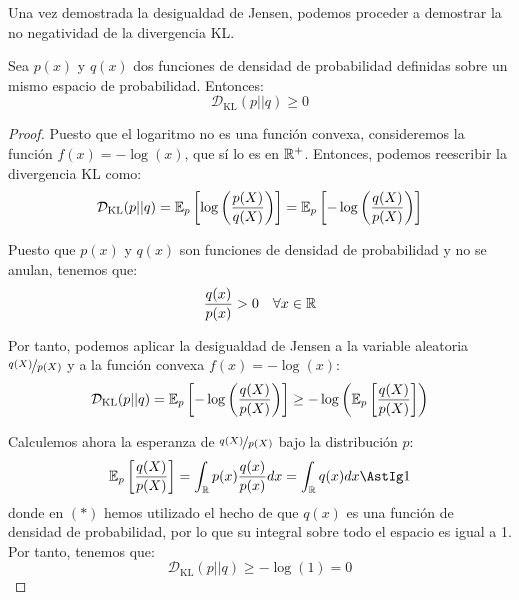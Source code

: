 \documentclass[12pt]{article}
\begin{document}
Una vez demostrada la desigualdad de Jensen, podemos proceder a demostrar la no negatividad de la divergencia KL.
\begin{teo}
Sea $p(x)$ y $q(x)$ dos funciones de densidad de probabilidad definidas sobre un mismo espacio de probabilidad. Entonces:
\begin{equation}
\mathcal{D}_{\text{KL}}(p||q) \geq 0
\end{equation}
\end{teo}
\begin{proof}
Puesto que el logaritmo no es una función convexa, consideremos la función $f(x) = -\log(x)$, que sí lo es en $\mathbb{R}^+$. Entonces, podemos reescribir la divergencia KL como:
\begin{equation*}
\mathcal{D}_{\text{KL}}(p||q) = \mathbb{E}_p\left[\log\left(\frac{p(X)}{q(X)}\right)\right] = \mathbb{E}_p\left[-\log\left(\frac{q(X)}{p(X)}\right)\right]
\end{equation*}

Puesto que $p(x)$ y $q(x)$ son funciones de densidad de probabilidad y no se anulan, tenemos que:
\begin{equation*}
  \dfrac{q(x)}{p(x)} > 0 \quad \forall x\in \mathbb{R}
\end{equation*}

Por tanto, podemos aplicar la desigualdad de Jensen a la variable aleatoria $\nicefrac{q(X)}{p(X)}$ y a la función convexa $f(x) = -\log(x)$:
\begin{equation*}
\mathcal{D}_{\text{KL}}(p||q) = \mathbb{E}_p\left[-\log\left(\frac{q(X)}{p(X)}\right)\right] \geq -\log\left(\mathbb{E}_p\left[\frac{q(X)}{p(X)}\right]\right)
\end{equation*}

Calculemos ahora la esperanza de $\nicefrac{q(X)}{p(X)}$ bajo la distribución $p$:
\begin{equation*}
\bb{E}_p\left[\frac{q(X)}{p(X)}\right] = \int_{\bb{R}} p(x) \frac{q(x)}{p(x)} dx = \int_{\bb{R}} q(x) dx \AstIg 1
\end{equation*}
donde en $(\ast)$ hemos utilizado el hecho de que $q(x)$ es una función de densidad de probabilidad, por lo que su integral sobre todo el espacio es igual a 1. Por tanto, tenemos que:
\begin{equation*}
\mathcal{D}_{\text{KL}}(p||q) \geq -\log(1) = 0
\end{equation*}
\end{proof}
\end{document}
